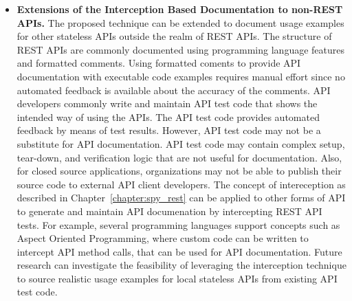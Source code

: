 \documentclass[12pt]{ucalgthes1}
\begin{document}
\begin{itemize}
  \item \textbf{Extensions of the Interception Based Documentation to non-REST APIs.} The proposed technique can be extended to document usage examples for other stateless APIs outside the realm of REST APIs. The structure of REST APIs are commonly documented using programming language features and formatted comments. Using formatted coments to provide API documentation with executable code examples requires manual effort since no automated feedback is available about the accuracy of the comments. API developers commonly write and maintain API test code that shows the intended way of using the APIs. The API test code provides automated feedback by means of test results. However, API test code may not be a substitute for API documentation. API test code may contain complex setup, tear-down, and verification logic that are not useful for documentation. Also, for closed source applications, organizations may not be able to publish their source code to external API client developers. The concept of intereception as described in Chapter~\ref{chapter:spy_rest} can be applied to other forms of API to generate and maintain API documenation by intercepting REST API tests. For example, several programming languages support concepts such as Aspect Oriented Programming, where custom code can be written to intercept API method calls, that can be used for API documentation. Future research can investigate the feasibility of leveraging the interception technique to source realistic usage examples for local stateless APIs from existing API test code.

\end{itemize}

\appendix

\end{document}
